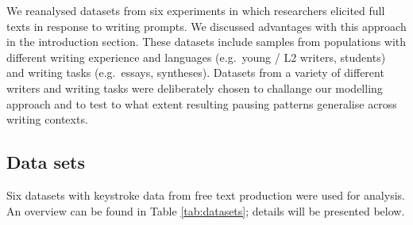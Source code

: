 \documentclass[
  english,
  man,floatsintext]{apa7}
\begin{document}
We reanalysed datasets from six experiments in which researchers elicited full texts in response to writing prompts. We discussed advantages with this approach in the introduction section. These datasets include samples from populations with different writing experience and languages (e.g.~young / L2 writers, students) and writing tasks (e.g.~essays, syntheses). Datasets from a variety of different writers and writing tasks were deliberately chosen to challange our modelling approach and to test to what extent resulting pausing patterns generalise across writing contexts.

\hypertarget{data-sets}{%
\subsection{Data sets}\label{data-sets}}

Six datasets with keystroke data from free text production were used for analysis. An overview can be found in Table \ref{tab:datasets}; details will be presented below.
\end{document}
